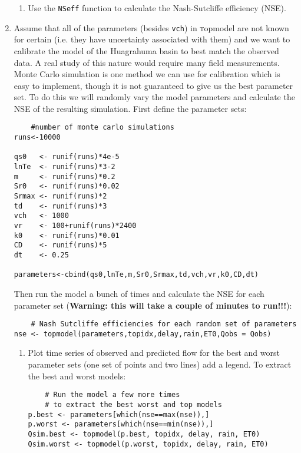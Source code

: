 \documentclass[11pt]{article}
\begin{document}
\begin{enumerate}
\begin{enumerate}
\item Use the \texttt{NSeff} function to calculate the Nash-Sutcliffe efficiency (NSE). 
\end{enumerate}



\item Assume that all of the parameters (besides \texttt{vch}) in {\textsc topmodel} are not known for certain (i.e. they have uncertainty associated with them) and we want to calibrate the model of the Huagrahuma basin to best match the observed data.  A real study of this nature would require many field measurements.  Monte Carlo simulation is one method we can use for calibration which is easy to implement, though it is not guaranteed to give us the best parameter set.  To do this we will randomly vary the model parameters and calculate the NSE of the resulting simulation. First define the parameter sets:

\begin{verbatim}
    #number of monte carlo simulations
runs<-10000

qs0   <- runif(runs)*4e-5
lnTe  <- runif(runs)*3-2
m     <- runif(runs)*0.2
Sr0   <- runif(runs)*0.02
Srmax <- runif(runs)*2
td    <- runif(runs)*3
vch   <- 1000
vr    <- 100+runif(runs)*2400
k0    <- runif(runs)*0.01
CD    <- runif(runs)*5
dt    <- 0.25

parameters<-cbind(qs0,lnTe,m,Sr0,Srmax,td,vch,vr,k0,CD,dt)
\end{verbatim}

Then run the model a bunch of times and calculate the NSE for each parameter set ({\bf Warning: this will take a couple of minutes to run!!!}):

\begin{verbatim}
    # Nash Sutcliffe efficiencies for each random set of parameters
nse <- topmodel(parameters,topidx,delay,rain,ET0,Qobs = Qobs)
\end{verbatim}

\begin{enumerate}
\item Plot time series of observed and predicted flow for the best and worst parameter sets (one set of points and two lines) add a legend. To extract the best and worst models:

\begin{verbatim}
    # Run the model a few more times 
    # to extract the best worst and top models
p.best <- parameters[which(nse==max(nse)),]
p.worst <- parameters[which(nse==min(nse)),]
Qsim.best <- topmodel(p.best, topidx, delay, rain, ET0)
Qsim.worst <- topmodel(p.worst, topidx, delay, rain, ET0)
\end{verbatim}


\end{enumerate}
\end{enumerate}
\end{document}
